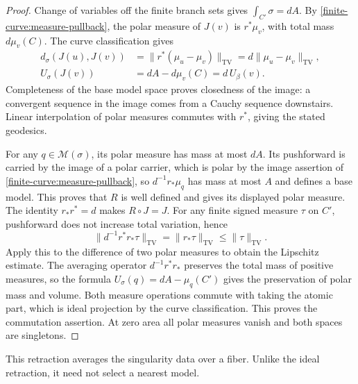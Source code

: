\begin{proof}
Change of variables off the finite branch sets gives
$\int_{C'}\sigma=dA$.
By \cref{finite-curve:measure-pullback}, the polar measure of
$J(v)$ is $r^*\mu_v$, with total mass $d\mu_v(C)$.
The curve classification gives
\[
 \begin{aligned}
 d_\sigma(J(u),J(v))
   &=\|r^*(\mu_u-\mu_v)\|_{\mathrm{TV}}
     =d\|\mu_u-\mu_v\|_{\mathrm{TV}},\\
 U_\sigma(J(v))
   &=dA-d\mu_v(C)=d\,U_\beta(v).
 \end{aligned}
\]
Completeness of the base model space proves closedness of the
image: a convergent sequence in the image comes from a
Cauchy sequence downstairs. Linear interpolation of polar
measures commutes with $r^*$, giving the stated geodesics.

For any $q\in\mathcal M(\sigma)$, its polar measure has mass
at most $dA$. Its pushforward is carried by the image of a polar
carrier, which is polar by the image assertion
of \cref{finite-curve:measure-pullback}, so
$d^{-1}r_*\mu_q$ has mass at most $A$ and defines a base model.
This proves that $R$ is well defined and gives its displayed
polar measure. The identity $r_*r^*=d$ makes $R\circ J=J$.
For any finite signed measure $\tau$ on $C'$,
pushforward does not increase total variation, hence
\[
 \|d^{-1}r^*r_*\tau\|_{\mathrm{TV}}
       =\|r_*\tau\|_{\mathrm{TV}}
       \leq\|\tau\|_{\mathrm{TV}}.
\]
Apply this to the difference of two polar measures to obtain
the Lipschitz estimate.
The averaging operator $d^{-1}r^*r_*$ preserves the total mass
of positive measures, so the formula $U_\sigma(q)=dA-\mu_q(C')$
gives the preservation of polar mass and volume.
Both measure operations commute with taking the atomic part,
which is ideal projection by the curve classification.
This proves the commutation assertion. At zero area all
polar measures vanish and both spaces are singletons.
\end{proof}

This retraction averages the singularity data over a fiber.
Unlike the ideal retraction, it need not select a nearest model.

